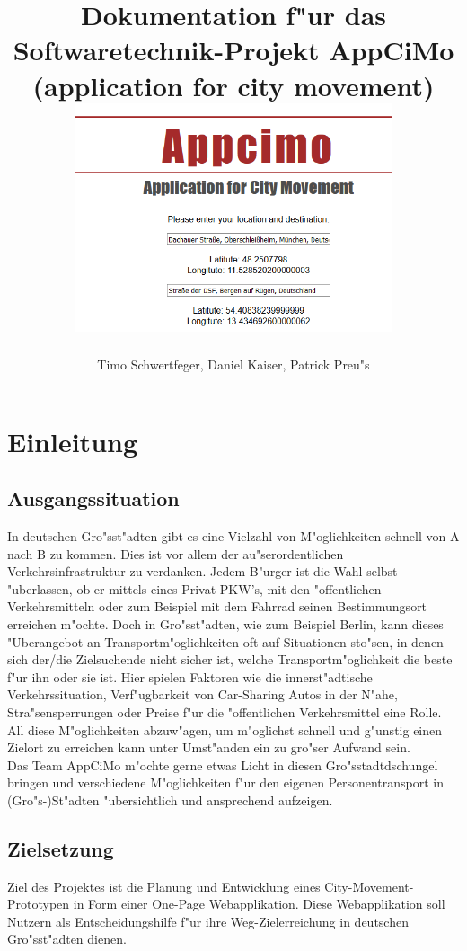 \documentclass[a4paper, 11pt]{scrreprt}
\author{Timo Schwertfeger, Daniel Kaiser, Patrick Preu"s}
\title{Dokumentation f"ur das Softwaretechnik-Projekt AppCiMo (application for city movement) 
\newline
\newline
\includegraphics[width=0.7\textwidth]{appcimo.png}}
\begin{document}
\maketitle

\setcounter{secnumdepth}{5}
\setcounter{tocdepth}{5}

\tableofcontents


\chapter{Einleitung}





\section{Ausgangssituation}
In deutschen Gro"sst"adten gibt es eine Vielzahl von M"oglichkeiten schnell von A nach B zu kommen. Dies ist vor allem der au"serordentlichen Verkehrsinfrastruktur zu verdanken. Jedem B"urger ist die Wahl selbst "uberlassen, ob er mittels eines Privat-PKW’s, mit den "offentlichen Verkehrsmitteln oder zum Beispiel mit dem Fahrrad seinen Bestimmungsort erreichen m"ochte. Doch in Gro"sst"adten, wie zum Beispiel Berlin, kann dieses "Uberangebot an Transportm"oglichkeiten oft auf Situationen sto"sen, in denen sich der/die Zielsuchende nicht sicher ist, welche Transportm"oglichkeit die beste f"ur ihn oder sie ist. Hier spielen Faktoren wie die innerst"adtische Verkehrssituation, Verf"ugbarkeit von Car-Sharing Autos in der N"ahe, Stra"sensperrungen oder Preise f"ur die "offentlichen Verkehrsmittel eine Rolle. All diese M"oglichkeiten abzuw"agen, um m"oglichst schnell und g"unstig einen Zielort zu erreichen kann unter Umst"anden ein zu gro"ser Aufwand sein. \\

Das Team AppCiMo m"ochte gerne etwas Licht in diesen Gro"sstadtdschungel bringen und verschiedene M"oglichkeiten f"ur den eigenen Personentransport in (Gro"s-)St"adten "ubersichtlich und ansprechend aufzeigen.



\section{Zielsetzung}
Ziel des Projektes ist die Planung und Entwicklung eines City-Movement-Prototypen in Form einer One-Page Webapplikation. Diese Webapplikation soll Nutzern als Entscheidungshilfe f"ur ihre Weg-Zielerreichung in deutschen Gro"sst"adten dienen. \\
\end{document}
